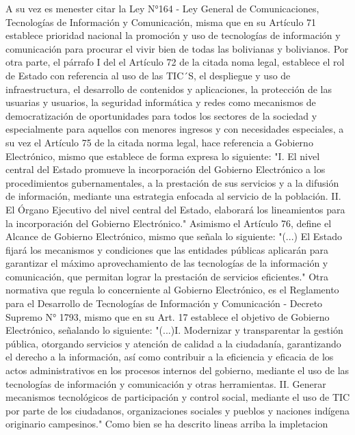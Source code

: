 A su vez es menester citar la Ley N°164 - Ley General de Comunicaciones, Tecnologías de Información y Comunicación, misma que en su Artículo 71 establece prioridad nacional la promoción y uso de tecnologías de información y comunicación para procurar el vivir bien de todas las bolivianas y bolivianos. Por otra parte, el párrafo I del el Artículo 72 de la citada noma legal, establece el rol de Estado con referencia al uso de las TIC´S, el despliegue y uso de infraestructura, el desarrollo de contenidos y aplicaciones, la protección de las usuarias y usuarios, la seguridad informática y redes como mecanismos de democratización de oportunidades para todos los sectores de la sociedad y especialmente para aquellos con menores ingresos y con necesidades especiales, a su vez el Artículo 75 de la citada norma legal, hace referencia a Gobierno Electrónico, mismo que establece de forma expresa lo siguiente: "I. El nivel central del Estado promueve la incorporación del Gobierno Electrónico a los procedimientos gubernamentales, a la prestación de sus servicios y a la difusión de información, mediante una estrategia enfocada al servicio de la población. II. El Órgano Ejecutivo del nivel central del Estado, elaborará los lineamientos para la incorporación del Gobierno Electrónico." Asimismo el Artículo 76, define el Alcance de Gobierno Electrónico, mismo que señala lo siguiente: "(...) El Estado fijará los mecanismos y condiciones que las entidades públicas aplicarán para garantizar el máximo aprovechamiento de las tecnologías de la información y comunicación, que permitan lograr la prestación de servicios eficientes." 
 Otra normativa que regula lo concerniente al Gobierno Electrónico, es el Reglamento para el Desarrollo de Tecnologías de Información y Comunicación - Decreto Supremo N° 1793, mismo que en su Art. 17 establece el objetivo de Gobierno Electrónico, señalando lo siguiente: "(...)I. Modernizar y transparentar la gestión pública, otorgando servicios y atención de calidad a la ciudadanía, garantizando el derecho a la información, así como contribuir a la eficiencia y eficacia de los actos administrativos en los procesos internos del gobierno, mediante el uso de las tecnologías de información y comunicación y otras herramientas. II. Generar mecanismos tecnológicos de participación y control social, mediante el uso de TIC por parte de los ciudadanos, organizaciones sociales y pueblos y naciones indígena originario campesinos."
Como bien se ha descrito lineas arriba la impletacion 
